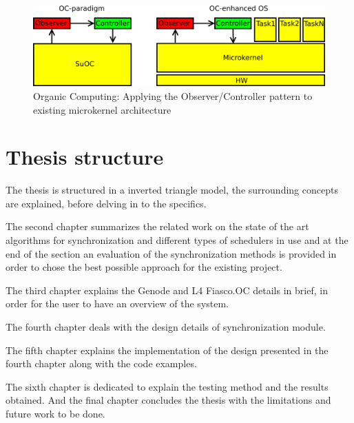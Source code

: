 \begin{figure}[h][architecture]
  \centering
  \includegraphics[scale = 0.5]{figures/microkernel_architecture.png}
  \caption{Organic Computing: Applying the Observer/Controller pattern to existing microkernel architecture \cite{kia4sm}}\label{architeture}
\end{figure}

\section{Thesis structure}
The thesis is structured in a inverted triangle model, the surrounding concepts are explained, before delving in to the specifics. 

The second chapter summarizes the related work on the state of the art algorithms for synchronization and different types of schedulers in use and at the end of the section an evaluation of the synchronization methods is provided in order to chose the best possible approach for the existing project.

The third chapter explains the Genode and L4 Fiasco.OC details in brief, in order for the user to have an overview of the system. 

The fourth chapter deals with the design details of synchronization module.

The fifth chapter explains the implementation of the design presented in the fourth chapter along with the code examples.  

The sixth chapter is dedicated to explain the testing method and the results obtained.
And the final chapter concludes the thesis with the limitations and future work to be done. 